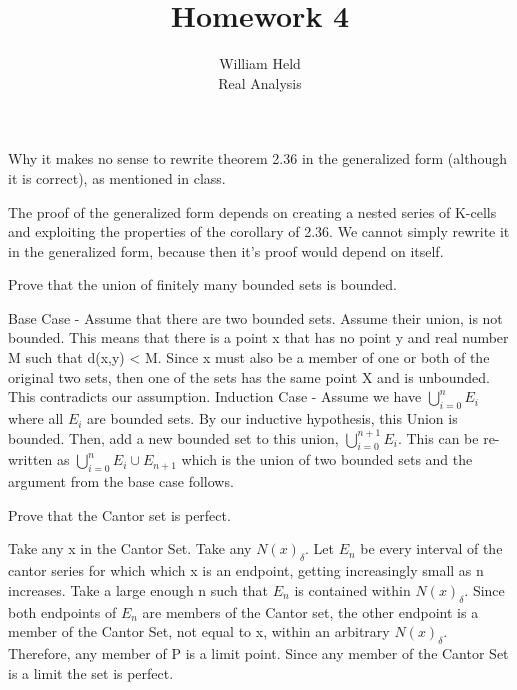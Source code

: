\documentclass[12pt]{article}
\newenvironment{exercise}[2][Exercise]{\begin{trivlist}
\item[\hskip \labelsep {\bfseries #1}\hskip \labelsep {\bfseries #2.}]}{\end{trivlist}}
\begin{document}
 
 
 
\title{Homework 4}%
\author{William Held\\ %
Real Analysis} %

\newcommand{\norm}[1]{\left\lVert#1\right\rVert}
\newcommand{\abs}[1]{|#1|}
\newcommand{\ceil}[1]{\left \lceil #1 \right \rceil }
\newcommand{\floor}[1]{\left \lfloor #1 \right \rfloor }
\let\biconditional\leftrightarrow
\maketitle
\begin{exercise}{1.1}
Why it makes no sense to rewrite theorem 2.36 in the generalized form (although it is correct), as mentioned in class.
\end{exercise}
The proof of the generalized form depends on creating a nested series of K-cells and exploiting the properties of the corollary of 2.36. We cannot simply rewrite it in the generalized form, because then it's proof would depend on itself.

\begin{exercise}{1.2}
Prove that the union of finitely many bounded sets is bounded.
\end{exercise}
Base Case - Assume that there are two bounded sets. Assume their union, is not bounded. This means that there is a point x that has no point y and real number M such that d(x,y) < M. Since x must also be a member of one or both of the original two sets, then one of the sets has the same point X and is unbounded. This contradicts our assumption.
Induction Case - Assume we have $\bigcup\limits_{i=0}^{n} E_i$ where all $E_i$ are bounded sets. By our inductive hypothesis, this Union is bounded. Then, add a new bounded set to this union, $\bigcup\limits_{i=0}^{n+1} E_i$. This can be re-written as $\bigcup\limits_{i=0}^{n} E_i \cup E_{n+1}$ which is the union of two bounded sets and the argument from the base case follows. 

\begin{exercise}{1.3}
Prove that the Cantor set is perfect.
\end{exercise}
Take any x in the Cantor Set. Take any $N(x)_\delta$. Let $E_n$ be every interval of the cantor series for which which x is an endpoint, getting increasingly small as n increases. Take a large enough n such that $E_n$ is contained within $N(x)_\delta$. Since both endpoints of $E_n$ are members of the Cantor set, the other endpoint is a member of the Cantor Set, not equal to x, within an arbitrary $N(x)_\delta$. Therefore, any member of P is a limit point. Since any member of the Cantor Set is a limit the set is perfect.
\end{document}
